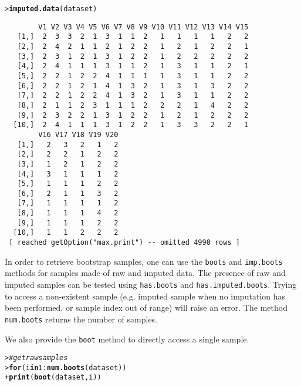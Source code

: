 \documentclass{article}\usepackage[]{graphicx}\usepackage[]{color}
\makeatletter
\newcommand{\hlnum}[1]{\textcolor[rgb]{0.686,0.059,0.569}{#1}}%
\newcommand{\hlcom}[1]{\textcolor[rgb]{0.678,0.584,0.686}{\textit{#1}}}%
\newcommand{\hlopt}[1]{\textcolor[rgb]{0,0,0}{#1}}%
\newcommand{\hlstd}[1]{\textcolor[rgb]{0.345,0.345,0.345}{#1}}%
\newcommand{\hlkwa}[1]{\textcolor[rgb]{0.161,0.373,0.58}{\textbf{#1}}}%
\newcommand{\hlkwd}[1]{\textcolor[rgb]{0.737,0.353,0.396}{\textbf{#1}}}%
\newenvironment{kframe}{%
 \def\at@end@of@kframe{}%
 \ifinner\ifhmode%
  \def\at@end@of@kframe{\end{minipage}}%
  \begin{minipage}{\columnwidth}%
 \fi\fi%
 \def\FrameCommand##1{\hskip\@totalleftmargin \hskip-\fboxsep
 \colorbox{shadecolor}{##1}\hskip-\fboxsep
     \hskip-\linewidth \hskip-\@totalleftmargin \hskip\columnwidth}%
 \MakeFramed {\advance\hsize-\width
   \@totalleftmargin\z@ \linewidth\hsize
   \@setminipage}}%
 {\par\unskip\endMakeFramed%
 \at@end@of@kframe}
\newenvironment{knitrout}{}{} %
\newcommand{\Rmethod}[1]{{\texttt{#1}}}
\makeatother
\begin{document}
\begin{knitrout}
\begin{kframe}
{\ttfamily\noindent\itshape\color{messagecolor}{bnstruct :: performing imputation ...\\bnstruct :: imputation finished.}}\begin{alltt}
\hlstd{> }\hlkwd{imputed.data}\hlstd{(dataset)}
\end{alltt}
\begin{verbatim}
        V1 V2 V3 V4 V5 V6 V7 V8 V9 V10 V11 V12 V13 V14 V15
   [1,]  2  3  3  2  1  3  1  1  2   1   1   1   1   2   2
   [2,]  2  4  2  1  1  2  1  2  2   1   2   1   2   2   1
   [3,]  2  3  1  2  1  3  1  2  2   1   2   2   2   2   2
   [4,]  2  4  1  1  1  3  1  1  2   1   3   1   1   2   1
   [5,]  2  2  1  2  2  4  1  1  1   1   3   1   1   2   2
   [6,]  2  2  1  2  1  4  1  3  2   1   3   1   3   2   2
   [7,]  2  2  1  2  2  4  1  3  2   1   3   1   1   2   2
   [8,]  2  1  1  2  3  1  1  1  2   2   2   1   4   2   2
   [9,]  2  3  2  2  1  3  1  2  2   1   2   1   2   2   2
  [10,]  2  4  1  1  1  3  1  2  2   1   3   3   2   2   1
        V16 V17 V18 V19 V20
   [1,]   2   3   2   1   2
   [2,]   2   2   1   2   2
   [3,]   1   2   1   2   2
   [4,]   3   1   1   1   2
   [5,]   1   1   1   2   2
   [6,]   2   1   1   3   2
   [7,]   1   1   1   1   2
   [8,]   1   1   1   4   2
   [9,]   1   1   1   2   2
  [10,]   1   1   2   2   2
 [ reached getOption("max.print") -- omitted 4990 rows ]
\end{verbatim}
\end{kframe}
\end{knitrout}

In order to retrieve bootstrap samples, one can use the \Rmethod{boots} and \Rmethod{imp.boots} methods for samples
made of raw and imputed data. The presence of raw and imputed samples can be tested using \Rmethod{has.boots} and \Rmethod{has.imputed.boots}.
Trying to access a non-existent sample (e.g. imputed sample when no imputation has been performed,
or sample index out of range) will raise an error. The method \Rmethod{num.boots} returns the number of samples.

We also provide the \Rmethod{boot} method to directly access a single sample.

\begin{knitrout}
\color{fgcolor}\begin{kframe}
\begin{alltt}
\hlstd{> }\hlcom{# get raw samples}
\hlstd{> }\hlkwa{for} \hlstd{(i} \hlkwa{in} \hlnum{1}\hlopt{:}\hlkwd{num.boots}\hlstd{(dataset))}
\hlstd{+ }  \hlkwd{print}\hlstd{(} \hlkwd{boot}\hlstd{(dataset, i) )}
\end{alltt}
\end{kframe}
\end{knitrout}
\end{document}
